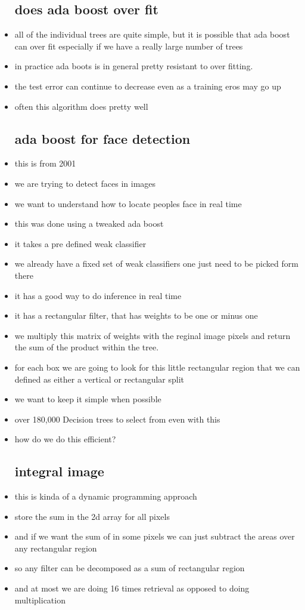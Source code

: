 \documentclass{article}
\begin{document}
\begin{itemize}
\subsection*{does ada boost over fit}
\item all of the individual trees are quite simple, but it is possible that ada boost can over fit especially if we have a really large number of trees
\item in practice ada boots is in general pretty resistant to over fitting. 
\item the test error can continue to decrease even as a training eros may go up 
\item often this algorithm does pretty well 
\subsection*{ada boost for face detection}
\item this is from 2001 
\item we are trying to detect faces in images
\item we want to understand how to locate peoples face in real time 
\item this was done using a tweaked ada boost 
\item it takes a pre defined weak classifier
\item we already have a fixed set of weak classifiers one just need to be picked form there 
\item it has a good way to do inference in real time 
\item it has a rectangular filter, that has weights to be one or minus one 
\item we multiply this matrix of weights with the reginal image pixels and return the sum of the 
product within the tree. 
\item for each box we are going to look for this little rectangular region that we can defined
as either a vertical or rectangular split 
\item we want to keep it simple when possible 
\item over 180,000 Decision trees to select from even with this 
\item how do we do this efficient?
\subsection*{integral image}
\item this is kinda of a dynamic programming approach
\item store the sum in the 2d array for all pixels 
\item and if we want the sum of in some pixels we can just subtract the areas over any rectangular region
\item so any filter can be decomposed as a sum of rectangular region 
\item and at most we are doing 16 times retrieval as opposed to doing multiplication 

\end{itemize}
\end{document}

